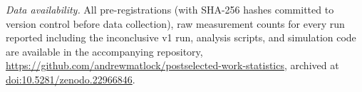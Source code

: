 \documentclass[aps,pra,twocolumn,superscriptaddress,nofootinbib]{revtex4-2}
\begin{document}
\emph{Data availability.} All pre-registrations (with SHA-256 hashes committed to version control before data collection), raw measurement counts for every run reported including the inconclusive v1 run, analysis scripts, and simulation code are available in the accompanying repository, \url{https://github.com/andrewmatlock/postselected-work-statistics}, archived at \href{https://doi.org/10.5281/zenodo.22966846}{doi:10.5281/zenodo.22966846}.


\end{document}
